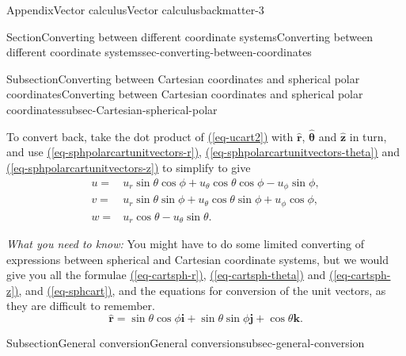 \documentclass[oneside,10pt,]{book}
\newcommand{\xreffont}{\relax}
\newcommand{\ptxlistdisc}{\raisebox{0.3ex}{\textbullet}}
\newcommand{\ptxlistcircle}{\raisebox{0.3ex}{\textopenbullet}}
\numberwithin{equation}{section}
\begin{document}
\begin{appendixptx}{Appendix}{Vector calculus}{}{Vector calculus}{}{}{backmatter-3}
\begin{sectionptx}{Section}{Converting between different coordinate systems}{}{Converting between different coordinate systems}{}{}{sec-converting-between-coordinates}
\begin{subsectionptx}{Subsection}{Converting between Cartesian coordinates and spherical polar coordinates}{}{Converting between Cartesian coordinates and spherical polar coordinates}{}{}{subsec-Cartesian-spherical-polar}
\begin{itemize}[label=\ptxlistdisc]
\begin{itemize}[label=\ptxlistcircle]
To convert back, take the dot product of \hyperref[eq-ucart2]{({\xreffont\ref{eq-ucart2}})} with \(\hat{\boldsymbol{r}}\), \(\hat{\boldsymbol{\theta}}\) and \(\hat{\boldsymbol{z}}\) in turn, and use \hyperref[eq-sphpolarcartunitvectors-r]{({\xreffont\ref{eq-sphpolarcartunitvectors-r}})}, \hyperref[eq-sphpolarcartunitvectors-theta]{({\xreffont\ref{eq-sphpolarcartunitvectors-theta}})} and \hyperref[eq-sphpolarcartunitvectors-z]{({\xreffont\ref{eq-sphpolarcartunitvectors-z}})} to simplify to give%
\begin{align*}
u=&u_r\sin\theta\cos\phi+u_\theta\cos\theta\cos\phi-u_\phi\sin\phi,\\
v=&u_r\sin\theta\sin\phi+u_\theta\cos\theta\sin\phi+u_\phi\cos\phi,\\
w=&u_r\cos\theta-u_\theta\sin\theta.
\end{align*}
%
\end{itemize}
%
\end{itemize}
%
\par
\emph{What you need to know:} You might have to do some limited converting of expressions between spherical and Cartesian coordinate systems, but we would give you all the formulae \hyperref[eq-cartsph-r]{({\xreffont\ref{eq-cartsph-r}})}, \hyperref[eq-cartsph-theta]{({\xreffont\ref{eq-cartsph-theta}})} and \hyperref[eq-cartsph-z]{({\xreffont\ref{eq-cartsph-z}})}, and \hyperref[eq-sphcart]{({\xreffont\ref{eq-sphcart}})}, and the equations for conversion of the unit vectors, as they are difficult to remember.%
\begin{equation*}
\hat{\boldsymbol{r}}
=\sin\theta\cos\phi\boldsymbol{i}
+\sin\theta\sin\phi\boldsymbol{j}
+\cos\theta\boldsymbol{k}.
\end{equation*}
%
\end{subsectionptx}
%
%
\typeout{************************************************}
\typeout{************************************************}
%
\begin{subsectionptx}{Subsection}{General conversion}{}{General conversion}{}{}{subsec-general-conversion}

\end{subsectionptx}
\end{sectionptx}
\end{appendixptx}
\end{document}
